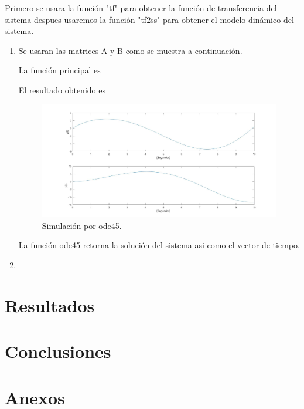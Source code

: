 \documentclass[12pt]{article}
\begin{document}
\begin{enumerate}
    
        
    Primero se usara la función "tf" para obtener la función de transferencia del sistema despues usaremos la función "tf2ss" para obtener el modelo dinámico del sistema.
    \begin{enumerate}
        \item Se usaran las matrices A y B como se muestra a continuación.
        
        
        
        La función principal es
        

        El resultado obtenido es
        \begin{figure}[h]
            \centering
            \includegraphics[width=15cm]{IMAGENES/9.jpg}
            \caption{Simulación por ode45.}
        \end{figure}
        
        La función ode45 retorna la solución del sistema asi como el vector de tiempo.
        \item 
    \end{enumerate}
\end{enumerate}
\section{Resultados}
\section{Conclusiones}
\section{Anexos}


\end{document}
